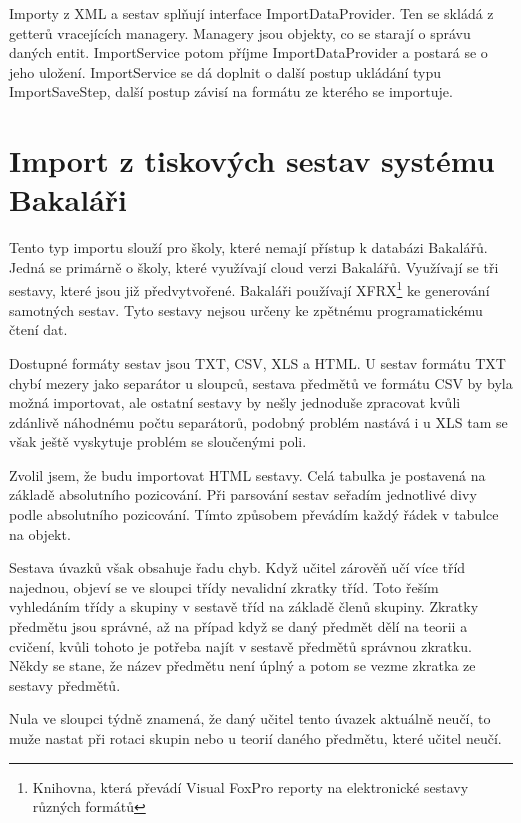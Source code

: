 Importy z XML a sestav splňují interface ImportDataProvider. Ten se skládá z getterů vracejících managery. Managery jsou objekty, co se starají o správu daných entit. ImportService potom příjme ImportDataProvider a postará se o jeho uložení. ImportService se dá doplnit o další postup ukládání typu ImportSaveStep, další postup závisí na formátu ze kterého se importuje.

\section{Import z tiskových sestav systému Bakaláři}
Tento typ importu slouží pro školy, které nemají přístup k databázi Bakalářů. 
Jedná se primárně o školy, které využívají cloud verzi Bakalářů. Využívají se tři sestavy, které jsou již předvytvořené. Bakaláři používají XFRX\footnote{Knihovna, která převádí Visual FoxPro reporty na elektronické sestavy různých formátů} ke generování samotných sestav. Tyto sestavy nejsou určeny ke zpětnému programatickému čtení dat.

Dostupné formáty sestav jsou TXT, CSV, XLS a HTML. U sestav formátu TXT chybí mezery jako separátor u sloupců, sestava předmětů ve formátu CSV by byla možná importovat, ale ostatní sestavy by nešly jednoduše zpracovat kvůli zdánlivě náhodnému počtu separátorů, podobný problém nastává i u XLS tam se však ještě vyskytuje problém se sloučenými poli.

Zvolil jsem, že budu importovat HTML sestavy. Celá tabulka je postavená na základě absolutního pozicování. Při parsování sestav seřadím jednotlivé divy podle absolutního pozicování. Tímto způsobem převádím každý řádek v tabulce na objekt.

Sestava úvazků však obsahuje řadu chyb. Když učitel zárověň učí více tříd najednou, objeví se ve sloupci třídy nevalidní zkratky tříd. Toto řeším vyhledáním třídy a skupiny v sestavě tříd na základě členů skupiny. 
Zkratky předmětu jsou správné, až na případ když se daný předmět dělí na teorii a cvičení,
kvůli tohoto je potřeba najít v sestavě předmětů správnou zkratku. Někdy se stane, že název předmětu není úplný a potom se vezme zkratka ze sestavy předmětů.

Nula ve sloupci týdně znamená, že daný učitel tento úvazek aktuálně neučí, to muže nastat při rotaci skupin nebo u teorií daného předmětu, které učitel neučí. 

